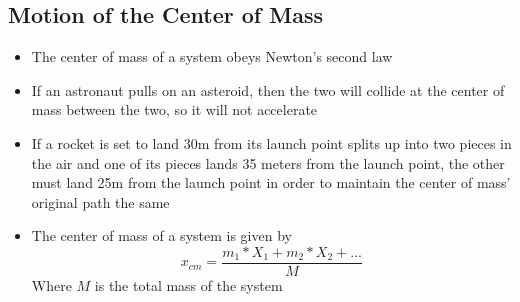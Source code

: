 \subsection{Motion of the Center of Mass}
\begin{itemize}
    \item The center of mass of a system obeys Newton's second law
    \item If an astronaut pulls on an asteroid, then the two will collide at the center of mass between the two, so it will not accelerate 
    \item If a rocket is set to land 30m from its launch point splits up into two pieces in the air and one of its pieces lands 35 meters from the launch point, the other must land 25m from the launch point in order to maintain the center of mass' original path the same
    \item The center of mass of a system is given by \[x_{cm}=\frac{m_1*X_1+m_2*X_2+...}{M}\] Where \(M\) is the total mass of the system
\end{itemize}
